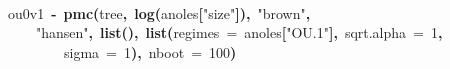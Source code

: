 \documentclass{elsarticle}
\makeatletter
\newcommand{\hlnumber}[1]{\textcolor[rgb]{0,0,0}{#1}}%
\newcommand{\hlfunctioncall}[1]{\textcolor[rgb]{.5,0,.33}{\textbf{#1}}}%
\newcommand{\hlstring}[1]{\textcolor[rgb]{.6,.6,1}{#1}}%
\newcommand{\hlkeyword}[1]{\textbf{#1}}%
\newcommand{\hlargument}[1]{\textcolor[rgb]{.69,.25,.02}{#1}}%
\newcommand{\hlassignement}[1]{\textbf{#1}}%
\newcommand{\hlsymbol}[1]{#1}%
\newcommand{\hlstd}[1]{\textcolor[rgb]{0,0,0}{#1}}%
\newenvironment{kframe}{%
 \def\FrameCommand##1{\hskip\@totalleftmargin \hskip-\fboxsep
 \colorbox{shadecolor}{##1}\hskip-\fboxsep
     \hskip-\linewidth \hskip-\@totalleftmargin \hskip\columnwidth}%
 \MakeFramed {\advance\hsize-\width
   \@totalleftmargin\z@ \linewidth\hsize
   \@setminipage}}%
 {\par\unskip\endMakeFramed}
\newenvironment{knitrout}{}{} %
\makeatother
\begin{document}
\begin{knitrout}
\begin{kframe}
\begin{flushleft}
\hlstd{}\hspace*{\fill}\\
\hlstd{}\hlsymbol{ou0v1}{\ }\hlassignement{\usebox{\hlnormalsizeboxlessthan}-}{\ }\hlfunctioncall{pmc}\hlkeyword{(}\hlsymbol{tree}\hlkeyword{,}{\ }\hlfunctioncall{log}\hlkeyword{(}\hlsymbol{anoles}\hlkeyword{[}\hlstring{"{}size"{}}\hlkeyword{]}\hlkeyword{)}\hlkeyword{,}{\ }\hlstring{"{}brown"{}}\hlkeyword{,}\hspace*{\fill}\\
\hlstd{}{\ }{\ }{\ }{\ }\hlstring{"{}hansen"{}}\hlkeyword{,}{\ }\hlfunctioncall{list}\hlkeyword{(}\hlkeyword{)}\hlkeyword{,}{\ }\hlfunctioncall{list}\hlkeyword{(}\hlargument{regimes}{\ }\hlargument{=}{\ }\hlsymbol{anoles}\hlkeyword{[}\hlstring{"{}OU.1"{}}\hlkeyword{]}\hlkeyword{,}{\ }\hlargument{sqrt.alpha}{\ }\hlargument{=}{\ }\hlnumber{1}\hlkeyword{,}\hspace*{\fill}\\
\hlstd{}{\ }{\ }{\ }{\ }{\ }{\ }{\ }{\ }\hlargument{sigma}{\ }\hlargument{=}{\ }\hlnumber{1}\hlkeyword{)}\hlkeyword{,}{\ }\hlargument{nboot}{\ }\hlargument{=}{\ }\hlnumber{100}\hlkeyword{)}\mbox{}
\normalfont
\end{flushleft}
\end{kframe}
\end{knitrout}
\end{document}
